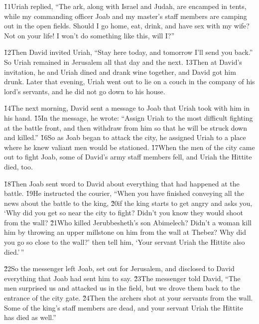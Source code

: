 \v{11}Uriah replied, ``The ark, along with Israel and Judah, are encamped in tents, while my commanding officer Joab and my master's staff members are camping out in the open fields. Should I go home, eat, drink, and have sex with my wife? Not on your life! I won't do something like this, will I?''

\v{12}Then David invited Uriah, ``Stay here today, and tomorrow I'll send you back.'' So Uriah remained in Jerusalem all that day and the next. \v{13}Then at David's invitation, he and Uriah dined and drank wine together, and David got him drunk. Later that evening, Uriah went out to lie on a couch in the company of his lord's servants, and he did not go down to his house.

\v{14}The next morning, David sent a message to Joab that Uriah took with him in his hand. \v{15}In the message, he wrote: ``Assign Uriah to the most difficult fighting at the battle front, and then withdraw from him so that he will be struck down and killed.'' \v{16}So as Joab began to attack the city, he assigned Uriah to a place where he knew valiant men would be stationed. \v{17}When the men of the city came out to fight Joab, some of David's army staff members fell, and Uriah the Hittite died, too.

\v{18}Then Joab sent word to David about everything that had happened at the battle. \v{19}He instructed the courier, ``When you have finished conveying all the news about the battle to the king, \v{20}if the king starts to get angry and asks you, `Why did you get so near the city to fight? Didn't you know they would shoot from the wall? \v{21}Who killed Jerubbesheth's son Abimelech? Didn't a woman kill him by throwing an upper millstone on him from the wall at Thebez? Why did you go so close to the wall?' then tell him, `Your servant Uriah the Hittite also died.'\,''

\v{22}So the messenger left Joab, set out for Jerusalem, and disclosed to David everything that Joab had sent him to say. \v{23}The messenger told David, ``The men surprised us and attacked us in the field, but we drove them back to the entrance of the city gate. \v{24}Then the archers shot at your servants from the wall. Some of the king's staff members are dead, and your servant Uriah the Hittite has died as well.''

